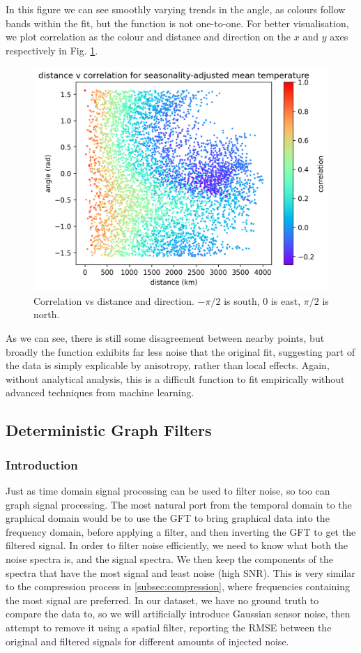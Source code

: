 \documentclass[12pt,a4paper]{article} %
\begin{document}
In this figure we can see smoothly varying trends in the angle, as colours follow bands within the fit, but the function is not one-to-one. For better visualisation, we plot correlation as the colour and distance and direction on the $x$ and $y$ axes respectively in Fig. \ref{fig:anisotropy_2}.
\begin{figure}[!ht]
    \centering
    \includegraphics[width=.8\linewidth]{mean_error_corr_by_dist_angle_2.png}
    \caption{Correlation vs distance and direction. $-\pi/2$ is south, $0$ is east, $\pi/2$ is north.}
    \label{fig:anisotropy_2}
\end{figure}
As we can see, there is still some disagreement between nearby points, but broadly the function exhibits far less noise that the original fit, suggesting part of the data is simply explicable by anisotropy, rather than local effects. Again, without analytical analysis, this is a difficult function to fit empirically without advanced techniques from machine learning.

\subsection{Deterministic Graph Filters}
\subsubsection{Introduction}
\label{subsec:filters_intro}
Just as time domain signal processing can be used to filter noise, so too can graph signal processing. The most natural port from the temporal domain to the graphical domain would be to use the GFT to bring graphical data into the frequency domain, before applying a filter, and then inverting the GFT to get the filtered signal. In order to filter noise efficiently, we need to know what both the noise spectra is, and the signal spectra. We then keep the components of the spectra that have the most signal and least noise (high SNR). This is very similar to the compression process in \ref{subsec:compression}, where frequencies containing the most signal are preferred. In our dataset, we have no ground truth to compare the data to, so we will artificially introduce Gaussian sensor noise, then attempt to remove it using a spatial filter, reporting the RMSE between the original and filtered signals for different amounts of injected noise.\\
\end{document}
